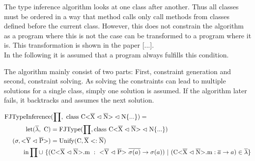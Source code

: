 The type inference algorithm looks at one class after another. Thus all classes must be ordered in a way that method calls only call methods from classes defined before the current class.
However, this does not constrain the algorithm as a program where this is not the case can be transformed to a program where it is.
This transformation is shown in the paper [...].
\\
In the following it is assumed that a program always fulfills this condition.

The algorithm mainly consist of two parts:
First, constraint generation and second, constraint solving.
As solving the constraints can lead to multiple solutions for a single class, simply one solution is assumed. If the algorithm later fails, it backtracks and assumes the next solution.

\begin{align*}
    \text{FJTypeInference}&(\prod, \ \classheader \{ ... \}) = \\
    \text{let} (\overline{\lambda}, \ \text{C}) &= \text{FJType}(\prod, \classheader \{ ... \}) \\
    (\sigma, \yp) &= \text{Unify}(\text{C}, \overline{\text{X}} <: \overline{\text{N}}) \\
    \text{in} \prod \cup \ \{( & \cm \ : \ \yp \ \oto{\sigma(a)}) \ | \ (\cm : \oto{a} ) \in \overline{\lambda} \}
\end{align*}
